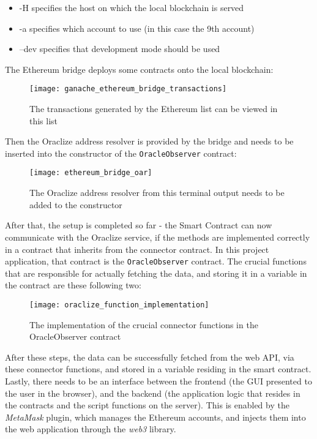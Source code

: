\begin{itemize}
	\item -H specifies the host on which the local blockchain is served
	\item -a specifies which account to use (in this case the 9th account)
	\item --dev specifies that development mode should be used
\end{itemize}
The Ethereum bridge deploys some contracts onto the local blockchain:
\begin{figure}[H]
\texttt{[image: ganache\_ethereum\_bridge\_transactions]}
\caption{The transactions generated by the Ethereum list can be viewed in this list}
\end{figure}
Then the Oraclize address resolver is provided by the bridge and needs to be inserted into the constructor of the \texttt{OracleObserver} contract:
\begin{figure}[H]
\texttt{[image: ethereum\_bridge\_oar]}
\caption{The Oraclize address resolver from this terminal output needs to be added to the constructor}
\end{figure}
After that, the setup is completed so far - the Smart Contract can now communicate with the Oraclize service, if the methods are implemented correctly in a contract that inherits from the connector contract. In this project application, that contract is the \texttt{OracleObserver} contract. The crucial functions that are responsible for actually fetching the data, and storing it in a variable in the contract are these following two:
\begin{figure}[H]
\texttt{[image: oraclize\_function\_implementation]}
\caption{The implementation of the crucial connector functions in the OracleObserver contract}
\end{figure}
After these steps, the data can be successfully fetched from the web API, via these connector functions, and stored in a variable residing in the smart contract. Lastly, there needs to be an interface between the frontend (the GUI presented to the user in the browser), and the backend (the application logic that resides in the contracts and the script functions on the server). This is enabled by the \emph{MetaMask} plugin, which manages the Ethereum accounts, and injects them into the web application through the \emph{web3} library. 
